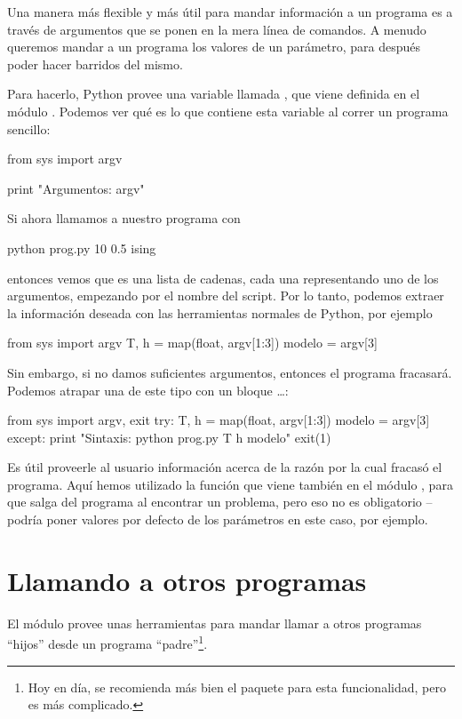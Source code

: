 Una manera más flexible y más útil para mandar información a un programa es a través de argumentos que se ponen en la mera línea de comandos. A menudo queremos
mandar a un programa los valores de un parámetro, para después poder hacer barridos del mismo.

Para hacerlo, Python provee una variable llamada , que viene definida en el módulo . Podemos ver qué es lo que contiene esta variable al correr un programa sencillo:
\begin{python}
from sys import argv

print "Argumentos: argv"
\end{python}
Si ahora llamamos a nuestro programa con
\begin{python}
python prog.py 10 0.5 ising
\end{python}
entonces vemos que  es una lista de cadenas, cada una representando uno de los argumentos, empezando por el nombre del script.
Por lo tanto, podemos extraer la información deseada con las herramientas normales de Python, por ejemplo
\begin{python}
from sys import argv
T, h = map(float, argv[1:3])
modelo = argv[3]
\end{python}

Sin embargo, si no damos suficientes argumentos, entonces el programa fracasará. Podemos atrapar una  de este tipo con un bloque \ldots{}:
\begin{python}
from sys import argv, exit
try:
  T, h = map(float, argv[1:3])
  modelo = argv[3]
except:
  print "Sintaxis: python prog.py T h modelo"
  exit(1)
\end{python}
Es útil proveerle al usuario información acerca de la razón por la cual fracasó el programa. Aquí hemos utilizado la función  que viene también en el módulo , para que salga del programa al encontrar un problema, pero eso no es obligatorio --podría poner valores por defecto de los parámetros en este caso, por ejemplo.


\section{Llamando a otros programas}

El módulo  provee unas herramientas para mandar llamar a otros programas ``hijos'' desde un programa ``padre''\footnote{Hoy en día, se recomienda más bien el paquete  para esta funcionalidad, pero es más complicado.}.

